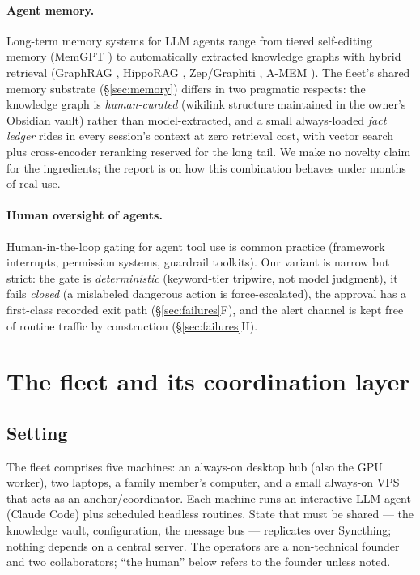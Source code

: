 \documentclass[11pt]{article}
\begin{document}
\paragraph{Agent memory.} Long-term memory systems for LLM agents range from tiered self-editing memory (MemGPT \cite{memgpt}) to automatically extracted knowledge graphs with hybrid retrieval (GraphRAG \cite{graphrag}, HippoRAG \cite{hipporag}, Zep/Graphiti \cite{zep}, A-MEM \cite{amem}). The fleet's shared memory substrate (\S\ref{sec:memory}) differs in two pragmatic respects: the knowledge graph is \emph{human-curated} (wikilink structure maintained in the owner's Obsidian vault) rather than model-extracted, and a small always-loaded \emph{fact ledger} rides in every session's context at zero retrieval cost, with vector search plus cross-encoder reranking reserved for the long tail. We make no novelty claim for the ingredients; the report is on how this combination behaves under months of real use.

\paragraph{Human oversight of agents.} Human-in-the-loop gating for agent tool use is common practice (framework interrupts, permission systems, guardrail toolkits). Our variant is narrow but strict: the gate is \emph{deterministic} (keyword-tier tripwire, not model judgment), it fails \emph{closed} (a mislabeled dangerous action is force-escalated), the approval has a first-class recorded exit path (\S\ref{sec:failures}F), and the alert channel is kept free of routine traffic by construction (\S\ref{sec:failures}H).

\section{The fleet and its coordination layer}\label{sec:system}
\subsection{Setting}
The fleet comprises five machines: an always-on desktop hub (also the GPU worker), two laptops, a family member's computer, and a small always-on VPS that acts as an anchor/coordinator. Each machine runs an interactive LLM agent (Claude Code) plus scheduled headless routines. State that must be shared --- the knowledge vault, configuration, the message bus --- replicates over Syncthing; nothing depends on a central server. The operators are a non-technical founder and two collaborators; ``the human'' below refers to the founder unless noted.
\end{document}
